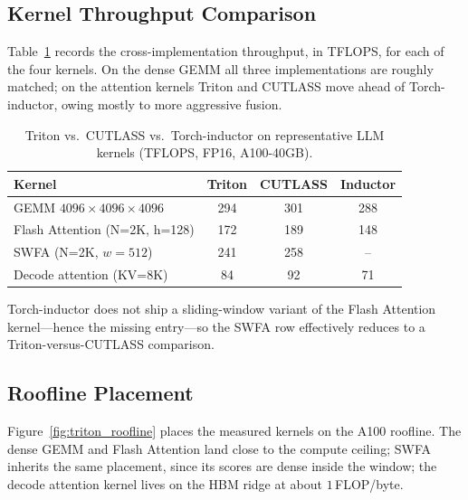 \subsection{Kernel Throughput
Comparison}\label{sec:triton_results_throughput}
Table~\ref{tab:triton_benchmarks} records the
cross-implementation throughput, in TFLOPS, for each of the four
kernels. On the dense GEMM all three implementations are roughly
matched; on the attention kernels Triton and CUTLASS move ahead
of Torch-inductor, owing mostly to more aggressive fusion.

\begin{table}[h]
\centering
\caption{Triton vs.\ CUTLASS vs.\ Torch-inductor on representative
         LLM kernels (TFLOPS, FP16, A100-40GB).}
\label{tab:triton_benchmarks}
\begin{tabular}{lccc}
\toprule
\textbf{Kernel}                         & \textbf{Triton} & \textbf{CUTLASS} & \textbf{Inductor} \\
\midrule
GEMM $4096\times4096\times4096$         & 294 & 301 & 288 \\
Flash Attention (N=2K, h=128)           & 172 & 189 & 148 \\
SWFA (N=2K, $w=512$)                    & 241 & 258 &  -- \\
Decode attention (KV=8K)                & 84  &  92 &  71 \\
\bottomrule
\end{tabular}
\end{table}

Torch-inductor does not ship a sliding-window variant of the
Flash Attention kernel---hence the missing entry---so the
SWFA row effectively reduces to a Triton-versus-CUTLASS
comparison.

\subsection{Roofline Placement}\label{sec:triton_roofline_results}
Figure~\ref{fig:triton_roofline} places the measured kernels on
the A100 roofline. The dense GEMM and Flash Attention land close
to the compute ceiling; SWFA inherits the same placement, since
its scores are dense inside the window; the decode attention
kernel lives on the HBM ridge at about $1$\,FLOP/byte.

